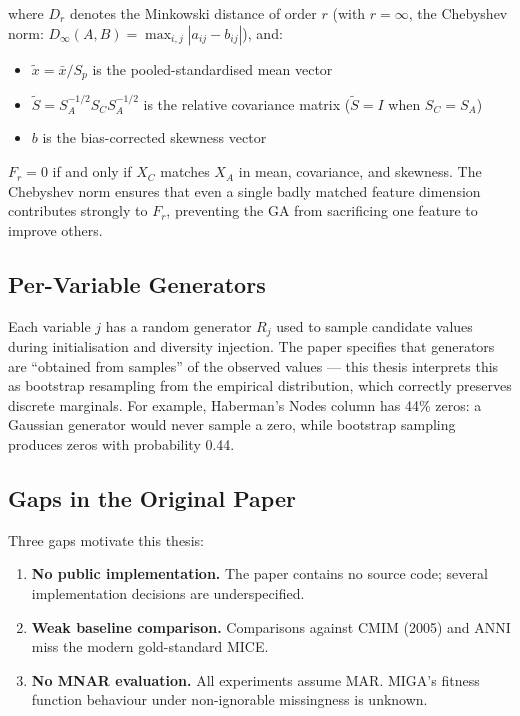 where $D_r$ denotes the Minkowski distance of order $r$ (with $r = \infty$, the Chebyshev norm: $D_\infty(A,B) = \max_{i,j}|a_{ij} - b_{ij}|$), and:
\begin{itemize}
    \item $\tilde{x} = \bar{x}/S_p$ is the pooled-standardised mean vector
    \item $\tilde{S} = S_A^{-1/2} S_C S_A^{-1/2}$ is the relative covariance matrix ($\tilde{S} = I$ when $S_C = S_A$)
    \item $b$ is the bias-corrected skewness vector
\end{itemize}

$F_r = 0$ if and only if $X_C$ matches $X_A$ in mean, covariance, and skewness. The Chebyshev norm ensures that even a single badly matched feature dimension contributes strongly to $F_r$, preventing the GA from sacrificing one feature to improve others.

\subsection{Per-Variable Generators}

Each variable $j$ has a random generator $R_j$ used to sample candidate values during initialisation and diversity injection. The paper specifies that generators are ``obtained from samples'' of the observed values --- this thesis interprets this as bootstrap resampling from the empirical distribution, which correctly preserves discrete marginals. For example, Haberman's Nodes column has 44\% zeros: a Gaussian generator would never sample a zero, while bootstrap sampling produces zeros with probability 0.44.

\subsection{Gaps in the Original Paper}

Three gaps motivate this thesis:
\begin{enumerate}
    \item \textbf{No public implementation.} The paper contains no source code; several implementation decisions are underspecified.
    \item \textbf{Weak baseline comparison.} Comparisons against CMIM (2005) and ANNI miss the modern gold-standard MICE.
    \item \textbf{No MNAR evaluation.} All experiments assume MAR. MIGA's fitness function behaviour under non-ignorable missingness is unknown.
\end{enumerate}

